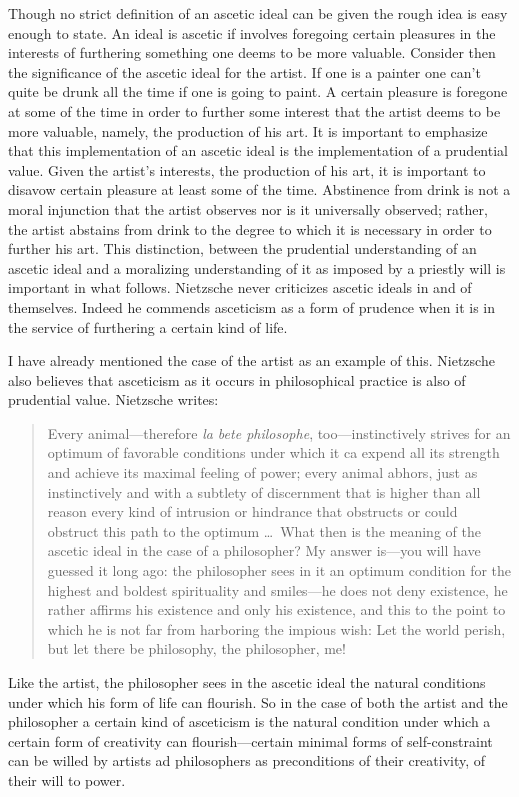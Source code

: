 Though no strict definition of an ascetic ideal can be given the rough idea is easy enough to state. An ideal is ascetic if involves foregoing certain pleasures in the interests of furthering something one deems to be more valuable. Consider then the significance of the ascetic ideal for the artist. If one is a painter one can't quite be drunk all the time if one is going to paint. A certain pleasure is foregone at some of the time in order to further some interest that the artist deems to be more valuable, namely, the production of his art. It is important to emphasize that this implementation of an ascetic ideal is the implementation of a prudential value. Given the artist's interests, the production of his art, it is important to disavow certain pleasure at least some of the time. Abstinence from drink is not a moral injunction that the artist observes nor is it universally observed; rather, the artist abstains from drink to the degree to which it is necessary in order to further his art. This distinction, between the prudential understanding of an ascetic ideal and a moralizing understanding of it as imposed by a priestly will is important in what follows. Nietzsche never criticizes ascetic ideals in and of themselves. Indeed he commends asceticism as a form of prudence when it is in the service of furthering a certain kind of life.

I have already mentioned the case of the artist as an example of this. Nietzsche also believes that asceticism as it occurs in philosophical practice is also of prudential value. Nietzsche writes:
\begin{quote}
    Every animal---therefore \emph{la bete philosophe}, too---instinctively strives for an optimum of favorable conditions under which it ca expend all its strength and achieve its maximal feeling of power; every animal abhors, just as instinctively and with a subtlety of discernment that is higher than all reason every kind of intrusion or hindrance that obstructs or could obstruct this path to the optimum \ldots\ What then is the meaning of the ascetic ideal in the case of a philosopher? My answer is---you will have guessed it long ago: the philosopher sees in it an optimum condition for the highest and boldest spirituality and smiles---he does not deny existence, he rather affirms his existence and only his existence, and this to the point to which he is not far from harboring the impious wish: Let the world perish, but let there be philosophy, the philosopher, me!
\end{quote}
Like the artist, the philosopher sees in the ascetic ideal the natural conditions under which his form of life can flourish. So in the case of both the artist and the philosopher a certain kind of asceticism is the natural condition under which a certain form of creativity can flourish---certain minimal forms of self-constraint can be willed by artists ad philosophers as preconditions of their creativity, of their will to power.

